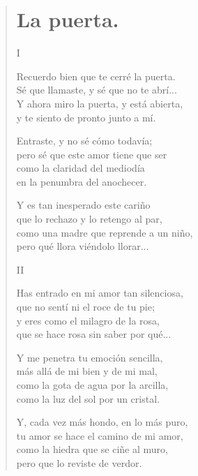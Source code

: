 \documentclass[11pt, portrait, twoside, notitlepage, openright]{book}
\begin{document}
\newpage
\begin{verse}
\begin{center}
\section{La puerta.}
\end{center}
\begin{center}
I
\end{center}

Recuerdo bien que te cerré la puerta.\\
Sé que llamaste, y sé que no te abrí...\\
Y ahora miro la puerta, y está abierta,\\
y te siento de pronto junto a mí.
\newline

Entraste, y no sé cómo todavía;\\
pero sé que este amor tiene que ser\\
como la claridad del mediodía\\
en la penumbra del anochecer.
\newline

Y es tan inesperado este cariño\\
que lo rechazo y lo retengo al par,\\
como una madre que reprende a un niño,\\
pero qué llora viéndolo llorar...
\newline

\begin{center}
II
\end{center}

Has entrado en mi amor tan silenciosa,\\
que no sentí ni el roce de tu pie;\\
y eres como el milagro de la rosa,\\
que se hace rosa sin saber por qué...
\newpage

Y me penetra tu emoción sencilla,\\
más allá de mi bien y de mi mal,\\
como la gota de agua por la arcilla,\\
como la luz del sol por un cristal.
\newline

Y, cada vez más hondo, en lo más puro,\\
tu amor se hace el camino de mi amor,\\
como la hiedra que se ciñe al muro,\\
pero que lo reviste de verdor.


\end{verse}
\end{document}
